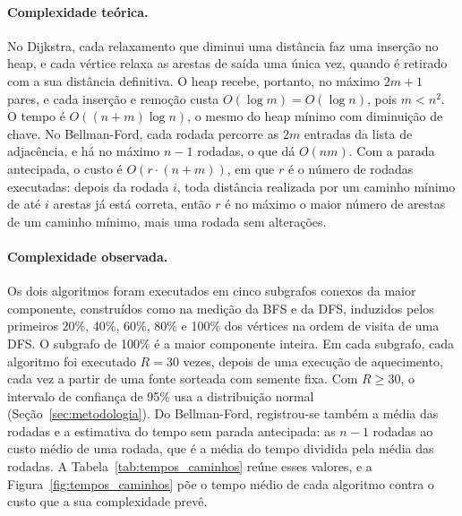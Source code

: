 \paragraph{Complexidade teórica.} No Dijkstra, cada relaxamento que diminui uma distância faz uma inserção no heap, e cada vértice relaxa as arestas de saída uma única vez, quando é retirado com a sua distância definitiva. O heap recebe, portanto, no máximo $2m + 1$ pares, e cada inserção e remoção custa $O(\log m) = O(\log n)$, pois $m < n^2$. O tempo é $O((n + m) \log n)$, o mesmo do heap mínimo com diminuição de chave. No Bellman-Ford, cada rodada percorre as $2m$ entradas da lista de adjacência, e há no máximo $n - 1$ rodadas, o que dá $O(nm)$. Com a parada antecipada, o custo é $O(r \cdot (n + m))$, em que $r$ é o número de rodadas executadas: depois da rodada $i$, toda distância realizada por um caminho mínimo de até $i$ arestas já está correta, então $r$ é no máximo o maior número de arestas de um caminho mínimo, mais uma rodada sem alterações.

\paragraph{Complexidade observada.} Os dois algoritmos foram executados em cinco subgrafos conexos da maior componente, construídos como na medição da BFS e da DFS, induzidos pelos primeiros 20\%, 40\%, 60\%, 80\% e 100\% dos vértices na ordem de visita de uma DFS. O subgrafo de 100\% é a maior componente inteira. Em cada subgrafo, cada algoritmo foi executado $R = 30$ vezes, depois de uma execução de aquecimento, cada vez a partir de uma fonte sorteada com semente fixa. Com $R \geq 30$, o intervalo de confiança de 95\% usa a distribuição normal (Seção~\ref{sec:metodologia}). Do Bellman-Ford, registrou-se também a média das rodadas e a estimativa do tempo sem parada antecipada: as $n - 1$ rodadas ao custo médio de uma rodada, que é a média do tempo dividida pela média das rodadas. A Tabela~\ref{tab:tempos_caminhos} reúne esses valores, e a Figura~\ref{fig:tempos_caminhos} põe o tempo médio de cada algoritmo contra o custo que a sua complexidade prevê.

\begin{table}[htbp]
  \centering
  \caption{Tempo de execução do Dijkstra e do Bellman-Ford próprios, com pesos inteiros aleatórios em $[1, 10]$, em subgrafos conexos crescentes da maior componente, com $R$ execuções a partir de fontes aleatórias: média das rodadas do Bellman-Ford até a parada antecipada, média, desvio padrão amostral e intervalo de confiança de 95\% do tempo e estimativa do tempo do Bellman-Ford com as $n - 1$ rodadas, sem parada antecipada.}
  \label{tab:tempos_caminhos}
  \resizebox{\textwidth}{!}{}
\end{table}

